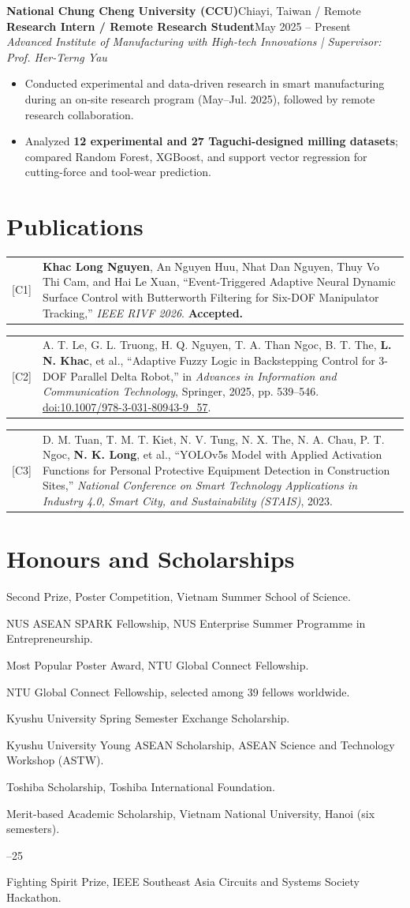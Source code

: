 \documentclass[11pt,a4paper]{article}
\makeatletter
\newcommand{\experience}[5]{%
  \par\needspace{6\baselineskip}\noindent\hspace*{0.22cm}\textbf{#1}\hfill #2\\[-1pt]
  \hspace*{0.22cm}\textbf{#3}\hfill #4\\[-1pt]
  \hspace*{0.22cm}\textit{#5}\par\vspace{2pt}}
\newenvironment{expbullets}{\begin{itemize}[leftmargin=0.52cm,topsep=3pt,itemsep=2.3pt,parsep=0pt,partopsep=0pt,label={\textperiodcentered}]}{\end{itemize}}
\newcommand{\publication}[2]{%
  \par\needspace{3\baselineskip}\noindent
  \begin{tabularx}{\textwidth}{@{\hspace{0.22cm}}p{0.69cm}@{\hspace{0.10cm}}X@{}}
    [#1] & #2
  \end{tabularx}\par\vspace{5pt}}
\newcommand{\award}[2]{\par\noindent\hspace*{0.24cm}\begin{minipage}[t]{\dimexpr\textwidth-2.25cm\relax}\textbullet\enspace #1\end{minipage}\hfill\begin{minipage}[t]{1.69cm}\raggedleft #2\end{minipage}\par\vspace{4.1pt}}
\makeatother
\begin{document}
\experience{National Chung Cheng University (CCU)}{Chiayi, Taiwan / Remote}{Research Intern / Remote Research Student}{May 2025 -- Present}{Advanced Institute of Manufacturing with High-tech Innovations | Supervisor: Prof. Her-Terng Yau}
\begin{expbullets}
  \item Conducted experimental and data-driven research in smart manufacturing during an on-site research program (May--Jul. 2025), followed by remote research collaboration.
  \item Analyzed \textbf{12 experimental and 27 Taguchi-designed milling datasets}; compared Random Forest, XGBoost, and support vector regression for cutting-force and tool-wear prediction.
\end{expbullets}

\section{Publications}
\publication{C1}{\textbf{Khac Long Nguyen}, An Nguyen Huu, Nhat Dan Nguyen, Thuy Vo Thi Cam, and Hai Le Xuan, ``Event-Triggered Adaptive Neural Dynamic Surface Control with Butterworth Filtering for Six-DOF Manipulator Tracking,'' \textit{IEEE RIVF 2026}. \textbf{Accepted.}}
\publication{C2}{A. T. Le, G. L. Truong, H. Q. Nguyen, T. A. Than Ngoc, B. T. The, \textbf{L. N. Khac}, et al., ``Adaptive Fuzzy Logic in Backstepping Control for 3-DOF Parallel Delta Robot,'' in \textit{Advances in Information and Communication Technology}, Springer, 2025, pp. 539--546. \href{https://doi.org/10.1007/978-3-031-80943-9_57}{doi:10.1007/978-3-031-80943-9\_57}.}
\publication{C3}{D. M. Tuan, T. M. T. Kiet, N. V. Tung, N. X. The, N. A. Chau, P. T. Ngoc, \textbf{N. K. Long}, et al., ``YOLOv5s Model with Applied Activation Functions for Personal Protective Equipment Detection in Construction Sites,'' \textit{National Conference on Smart Technology Applications in Industry 4.0, Smart City, and Sustainability (STAIS)}, 2023.}

\section{Honours and Scholarships}
\award{Second Prize, Poster Competition, Vietnam Summer School of Science.}{2026}
\award{NUS ASEAN SPARK Fellowship, NUS Enterprise Summer Programme in Entrepreneurship.}{2026}
\award{Most Popular Poster Award, NTU Global Connect Fellowship.}{2026}
\award{NTU Global Connect Fellowship, selected among 39 fellows worldwide.}{2026}
\award{Kyushu University Spring Semester Exchange Scholarship.}{2026}
\award{Kyushu University Young ASEAN Scholarship, ASEAN Science and Technology Workshop (ASTW).}{2025}
\award{Toshiba Scholarship, Toshiba International Foundation.}{2024}
\award{Merit-based Academic Scholarship, Vietnam National University, Hanoi (six semesters).}{2021--25}
\award{Fighting Spirit Prize, IEEE Southeast Asia Circuits and Systems Society Hackathon.}{2022}
\end{document}
